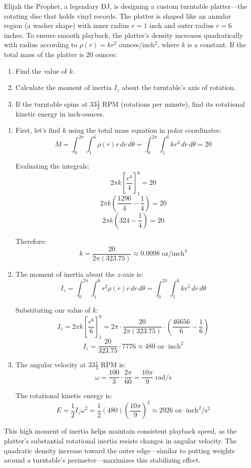 \exampleline
\begin{example}
Elijah the Prophet, a legendary DJ, is designing a custom turntable platter—the rotating disc that holds vinyl records. The platter is shaped like an annular region (a washer shape) with inner radius $r = 1$ inch and outer radius $r = 6$ inches. To ensure smooth playback, the platter's density increases quadratically with radius according to $\rho(r) = kr^2$ ounces/inch$^2$, where $k$ is a constant. If the total mass of the platter is 20 ounces:

\begin{enumerate}
   \item Find the value of $k$.
   \item Calculate the moment of inertia $I_z$ about the turntable's axis of rotation.
   \item If the turntable spins at $33\frac{1}{3}$ RPM (rotations per minute), find its rotational kinetic energy in inch-ounces.
\end{enumerate}

\begin{solution}
\begin{enumerate}
   \item First, let's find $k$ using the total mass equation in polar coordinates:
   \[
   M = \int_0^{2\pi} \int_1^6 \rho(r)r\,dr\,d\theta = \int_0^{2\pi} \int_1^6 kr^3\,dr\,d\theta = 20
   \]
   
   Evaluating the integrals:
   \[
   2\pi k \left[\frac{r^4}{4}\right]_1^6 = 20
   \]
   \[
   2\pi k \left(\frac{1296}{4} - \frac{1}{4}\right) = 20
   \]
   \[
   2\pi k(324 - \frac{1}{4}) = 20
   \]
   
   Therefore:
   \[
   k = \frac{20}{2\pi(323.75)} \approx 0.0098 \text{ oz/inch}^4
   \]

   \item The moment of inertia about the $z$-axis is:
   \[
   I_z = \int_0^{2\pi} \int_1^6 r^2\rho(r)r\,dr\,d\theta = \int_0^{2\pi} \int_1^6 kr^5\,dr\,d\theta
   \]
   
   Substituting our value of $k$:
   \[
   I_z = 2\pi k \left[\frac{r^6}{6}\right]_1^6 = 2\pi \cdot \frac{20}{2\pi(323.75)} \cdot \left(\frac{46656}{6} - \frac{1}{6}\right)
   \]
   \[
   I_z = \frac{20}{323.75} \cdot 7776 \approx 480 \text{ oz}\cdot\text{inch}^2
   \]

   \item The angular velocity at $33\frac{1}{3}$ RPM is:
   \[
   \omega = \frac{100}{3} \cdot \frac{2\pi}{60} = \frac{10\pi}{9} \text{ rad/s}
   \]
   
   The rotational kinetic energy is:
   \[
   E = \frac{1}{2}I_z\omega^2 = \frac{1}{2}(480)\left(\frac{10\pi}{9}\right)^2 \approx 2926 \text{ oz}\cdot\text{inch}^2/\text{s}^2
   \]
\end{enumerate}

\noindent This high moment of inertia helps maintain consistent playback speed, as the platter's substantial rotational inertia resists changes in angular velocity. The quadratic density increase toward the outer edge—similar to putting weights around a turntable's perimeter—maximizes this stabilizing effect.
\end{solution}
\end{example}
